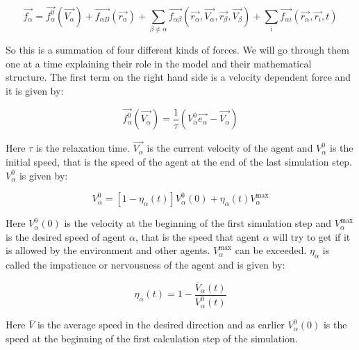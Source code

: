 \begin{equation}\label{model}
    \vec{f_{\alpha}} = \vec{f^{0}_{\alpha}}\left( \vec{V_{\alpha}} \right) + 
    \vec{f_{\alpha B}} \left( \vec{r_{\alpha}} \right) +
    \sum_{\beta \neq \alpha} \vec{f_{\alpha \beta}} \left(\vec{r_{\alpha}}, 
    \vec{V_{\alpha}}, \vec{r_{\beta}}, \vec{V_{\beta}} \right) +
    \sum_{i} \vec{f_{\alpha i}} \left( \vec{r_{\alpha}}, \vec{r_{i}}, t 
    \right)
\end{equation}

So this is a summation of four different kinds of forces. We will go through 
them one at a time explaining their role in the model and their mathematical 
structure. The first term on the right hand side is a velocity dependent force 
and it is given by:

\begin{equation}
	\vec{f^{0}_{\alpha}}\left( \vec{V_{\alpha}} \right) =
    \frac{1}{\tau}
    \left( V_{\alpha}^{0} \vec{e_{\alpha}} - \vec{V_{\alpha}} \right)
\end{equation}

Here $\tau$ is the relaxation time. $\vec{V_{\alpha}}$ is the 
current velocity of the agent and $V_{\alpha}^{0}$ is the initial speed, that is 
the speed of the agent at the end of the last simulation step. $V_{\alpha}^{0}$ is given by:

\begin{equation}
    V_{\alpha}^{0} = \left[ 1 - \eta_{\alpha} \left( t \right) \right] 
    V_{\alpha}^{0} \left( 0 \right) +
    \eta_{\alpha} \left( t \right)V_{\alpha}^{\text{max}}
\end{equation}

Here $V_{\alpha}^{0} \left( 0 \right)$ is the velocity at the beginning of the 
first simulation step and $V_{\alpha}^{\text{max}}$ is the desired speed of agent
$\alpha$, that is the speed that agent $\alpha$ will try to get if it is allowed by the 
environment and other agents. $V_{\alpha}^{\text{max}}$ can be exceeded. $\eta_{\alpha}$ 
is called the impatience or nervousness of the agent and is given by:

\begin{equation}
	\eta_{\alpha} \left( t \right) =
    1 - \frac{\overline{V}_{\alpha} \left( t \right)}
             {V_{\alpha}^{0} \left( t \right)}
\end{equation}

Here $\overline{V}$ is the average speed in the desired direction and as 
earlier $V_{\alpha}^{0} \left( 0 \right)$ is the speed at the beginning of the 
first calculation step of the simulation.

